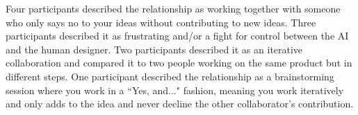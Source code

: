 Four participants described the relationship as working together with someone who only says no to your ideas without contributing to new ideas. Three participants described it as frustrating and/or a fight for control between the AI and the human designer. Two participants described it as an iterative collaboration and compared it to two people working on the same product but in different steps. One participant described the relationship as a brainstorming session where you work in a ``Yes, and..." fashion, meaning you work iteratively and only adds to the idea and never decline the other collaborator's contribution. 





